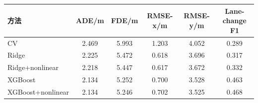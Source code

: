 \begin{tabular}{lccccc}
\toprule
方法 & ADE/m & FDE/m & RMSE-x/m & RMSE-y/m & Lane-change F1 \\ 
\midrule
CV & 2.469 & 5.993 & 1.203 & 4.052 & 0.289 \\ 
Ridge & 2.225 & 5.472 & 0.618 & 3.696 & 0.317 \\ 
Ridge+nonlinear & 2.218 & 5.447 & 0.617 & 3.672 & 0.332 \\ 
XGBoost & 2.134 & 5.252 & 0.700 & 3.528 & 0.463 \\ 
XGBoost+nonlinear & 2.134 & 5.246 & 0.702 & 3.525 & 0.468 \\ 
\bottomrule
\end{tabular}
